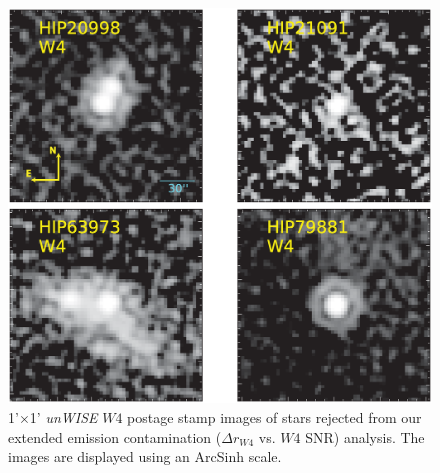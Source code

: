 \begin{figure}
\centering
\includegraphics[scale=0.5]{Ch4/W4W4_rejected_postagestamps}
\caption{1'$\times$1' \textit{unWISE} $W4$ postage stamp images of stars rejected from our extended emission contamination ($\Delta r_{W4}$ vs. $W4$ SNR) analysis. The images are displayed using an ArcSinh scale.}
\label{fig:w4w4_postagestamps}
\end{figure}





